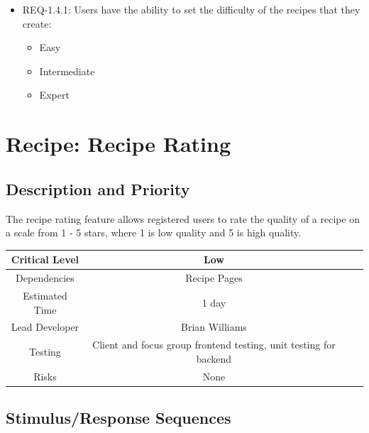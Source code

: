 \documentclass{scrreprt}
\begin{document}
\begin{itemize}
    \item REQ-1.4.1: Users have the ability to set the difficulty of the recipes that they create:
        \begin{itemize}
            \item Easy
            \item Intermediate
            \item Expert
        \end{itemize}
\end{itemize}

\section{Recipe: Recipe Rating}

\subsection{Description and Priority}

The recipe rating feature allows registered users to rate the quality of a recipe on a scale from 1 - 5 stars, where 1 is low quality and 5 is high quality.

\begin{center}
    \begin{tabular}{| c | c | c | c |}
        \hline
        Critical Level & Low                                                               \\
        \hline
        Dependencies   & Recipe Pages                                                      \\
        \hline
        Estimated Time & 1 day                                                             \\
        \hline
        Lead Developer & Brian Williams                                                    \\
        \hline
        Testing        & Client and focus group frontend testing, unit testing for backend \\
        \hline
        Risks          & None                                                              \\
        \hline
    \end{tabular}
\end{center}

\subsection{Stimulus/Response Sequences}
\end{document}

